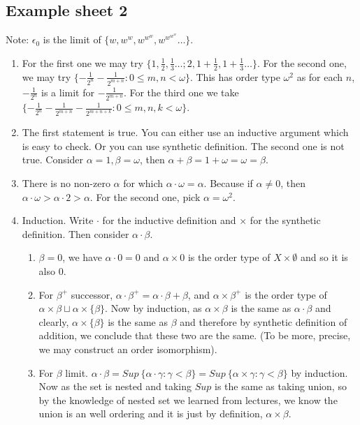 \subsection{Example sheet 2}
Note: $\epsilon_0$ is the limit of $\{w,w^w,w^{w^w},w^{w^{w^w}} \ldots\}$.
\begin{enumerate}
\item For the first one we may try $\{1,\frac{1}{2},\frac{1}{3} \ldots ; 2, 1+\frac{1}{2},1+\frac{1}{3} \ldots\}$. For the second one, we may try $\{-\frac{1}{2^n} - \frac{1}{2^{m+n}}: 0 \le m,n < \omega\}$. This has order type $\omega^2$ as for each $n$, $-\frac{1}{2^n}$ is a limit for $-\frac{1}{2^{m+n}}$. For the third one we take $\{-\frac{1}{2^n}-\frac{1}{2^{m+n}}-\frac{1}{2^{m+n+k}}: 0 \le m,n,k < \omega\}$.\\
\item The first statement is true. You can either use an inductive argument which is easy to check. Or you can use synthetic definition. The second one is not true. Consider $\alpha =1, \beta =\omega$, then $\alpha+\beta = 1+ \omega =\omega = \beta$.\\
\item There is no non-zero $\alpha$ for which $\alpha \cdot \omega=\alpha$. Because if $\alpha \neq 0$, then $\alpha \cdot \omega > \alpha \cdot 2 > \alpha$. For the second one, pick $\alpha=\omega^2$.\\
\item Induction. Write $\cdot$ for the inductive definition and $\times$ for the synthetic definition. Then consider $\alpha \cdot \beta$.
    \begin{enumerate}
    \item $\beta=0$, we have $\alpha \cdot 0=0$ and $\alpha \times 0$ is the order type of $X \times \emptyset$ and so it is also $0$.\\
    \item For $\beta^+$ successor, $\alpha \cdot \beta^+ = \alpha \cdot \beta + \beta$, and $\alpha \times \beta^+$ is the order type of $\alpha \times \beta \sqcup \alpha \times \{\beta\}$. Now by induction, as $\alpha \times \beta$ is the same as $\alpha \cdot \beta$ and clearly, $\alpha \times \{\beta\}$ is the same as $\beta$ and therefore by synthetic definition of addition, we conclude that these two are the same. (To be more, precise, we may construct an order isomorphism).\\
    \item For $\beta$ limit. $\alpha \cdot \beta = Sup~\{\alpha \cdot \gamma: \gamma < \beta\} =Sup~ \{\alpha \times \gamma: \gamma < \beta\}$ by induction. Now as the set is nested and taking $Sup$ is the same as taking union, so by the knowledge of nested set we learned from lectures, we know the union is an well ordering and it is just by definition, $\alpha \times \beta$.

\end{enumerate}
\end{enumerate}
